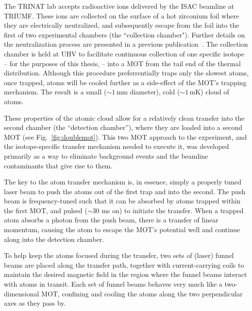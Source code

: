 The TRINAT lab accepts radioactive ions delivered by the ISAC beamline at TRIUMF.  These ions are collected on the surface of a hot zirconium foil where they are electrically neutralized, and subsequently escape from the foil into the first of two experimental chambers (the ``collection chamber").  Further details on the neutralization process are presented in a previous publication~\cite{gorelov2000}.  
%
The collection chamber is held at \ac{UHV} to facilitate continuous collection of one specific isotope -- for the purposes of this thesis,   -- into a \ac{MOT} from the tail end of the thermal distribution.  
%
Although this procedure preferrentially traps only the slowest atoms, once trapped, atoms will be cooled further as a side-effect of the MOT's trapping mechanism.  The result is a small ($\sim\!1\,$mm diameter), cold ($\sim\!1\,$mK) cloud of  atoms.  %

These properties of the atomic cloud allow for a relatively clean transfer into the second chamber (the ``detection chamber''), where they are loaded into a second \ac{MOT} (see Fig.~\ref{fig:doublemot}).  This two MOT approach to the experiment, and the isotope-specific transfer mechanism needed to execute it, was developed primarily as a way to eliminate background events and the beamline contaminants that give rise to them.  

The key to the atom transfer mechanism is, in essence, simply a properly tuned laser beam to push the atoms out of the first trap and into the second.  The push beam is frequency-tuned such that it can be absorbed by atoms trapped within the first MOT, and pulsed ($\sim$30 ms on) to initiate the transfer.  When a trapped atom absorbs a photon from the push beam, there is a transfer of linear momentum, causing the atom to escape the \ac{MOT}'s potential well and continue along into the detection chamber.  

To help keep the atoms focused during the transfer, two sets of (laser) funnel beams are placed along the transfer path, together with current-carrying coils to maintain the desired magnetic field in the region where the funnel beams interact with atoms in transit.  Each set of funnel beams behaves very much like a two-dimensional \ac{MOT},  confining and cooling the atoms along the two perpendicular axes as they pass by.  

